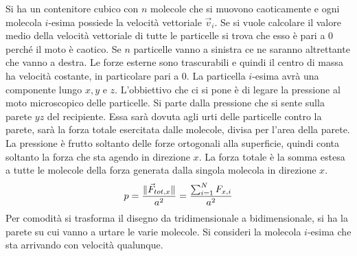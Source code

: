 \documentclass[10pt,a4paper]{book}
\DeclarePairedDelimiter{\norma}{\lVert}{\rVert} %
\begin{document}
Si ha un contenitore cubico con $n$ molecole che si muovono caoticamente e ogni molecola $i$-esima possiede la velocità vettoriale $\vec{v}_i$. Se si vuole calcolare il valore medio della velocità vettoriale di tutte le particelle si trova che esso è pari a $0$ perché il moto è caotico. Se $n$ particelle vanno a sinistra ce ne saranno altrettante che vanno a destra. Le forze esterne sono trascurabili e quindi il centro di massa ha velocità costante, in particolare pari a $0$. La particella $i$-esima avrà una componente lungo $x,y$ e $z$. L'obbiettivo che ci si pone è di legare la pressione al moto microscopico delle particelle. Si parte dalla pressione che si sente sulla parete $yz$ del recipiente. Essa sarà dovuta agli urti delle particelle contro la parete, sarà la forza totale esercitata dalle molecole, divisa per l'area della parete. La pressione è frutto soltanto delle forze ortogonali alla superficie, quindi conta soltanto la forza che sta agendo in direzione $x$. La forza totale è la somma estesa a tutte le molecole della forza generata dalla singola molecola in direzione $x$.
\[
	p = \frac{\norma{\vec{F}_{tot,x}} }{a^2} = \frac{\sum_{i=1}^N F_{x,i}}{a^2}
\]
Per comodità si trasforma il disegno da tridimensionale a bidimensionale, si ha la parete su cui vanno a urtare le varie molecole. Si consideri la molecola $i$-esima che sta arrivando con velocità qualunque.
\end{document}
